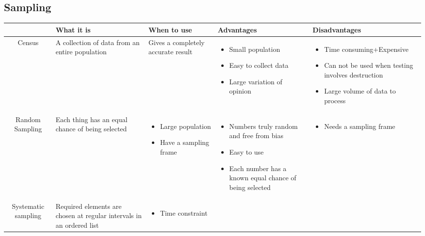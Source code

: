 \documentclass{article}[5pt]
\begin{document}
\setcounter{section}{2}
\setcounter{subsection}{1}
\subsection{Sampling}
\begin{tabularx}{\textwidth}{|c|X|X|X|X|}
\hline
&What it is&When to use&Advantages&Disadvantages\\
\hline
Census&A collection of data from an entire population&Gives a completely accurate result&
\begin{itemize}
\item Small population
\item Easy to collect data
\item Large variation of opinion
\end{itemize}&

\begin{itemize}
\item Time consuming+Expensive
\item Can not be used when testing involves destruction
\item Large volume of data to process
\end{itemize}\\
\hline


Random Sampling
&Each thing has an equal chance of being selected&

\begin{itemize}
\item Large population
\item Have a sampling frame
\end{itemize}&

\begin{itemize}
\item Numbers truly random and free from bias
\item Easy to use
\item Each number has a known equal chance of being selected
\end{itemize}&
\begin{itemize}
\item Needs a sampling frame
\end{itemize}\\
\hline


Systematic sampling
&Required elements are chosen at regular intervals in an ordered list&
\begin{itemize}
\item Time constraint
\end{itemize}&


\end{tabularx}
\end{document}

